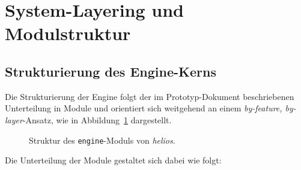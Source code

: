 \section{System-Layering und Modulstruktur}

\subsection{Strukturierung des Engine-Kerns}

Die Strukturierung der Engine folgt der im Prototyp-Dokument beschriebenen Unterteilung in Module und orientiert sich weitgehend an einem \textit{by-feature, by-layer}-Ansatz, wie in Abbildung~\ref{fig:engine_struktur} dargestellt.\\

\begin{figure}[!htbp]
    \setlength{\DTbaselineskip}{18pt}
    \caption{Struktur des \texttt{engine}-Moduls von \textit{helios}.}
    \label{fig:engine_struktur}
\end{figure}

Die Unterteilung der Module gestaltet sich dabei wie folgt:

